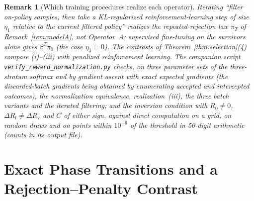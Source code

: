 \documentclass[11pt,a4paper]{article}
\newtheorem{remark}[theorem]{Remark}
\begin{document}
\begin{remark}[Which training procedures realize each operator]
Iterating ``filter on-policy samples, then take a KL-regularized reinforcement-learning step of size $\eta_1$ relative to the current filtered policy'' realizes the repeated-rejection law $\pi_T$ of Remark~\ref{rem:modelA}, not Operator~A; supervised fine-tuning on the survivors alone gives $\beta^T\pi_0$ (the case $\eta_1 = 0$).
The contrasts of Theorem~\ref{thm:selection}(4) compare (i)--(iii) with penalized reinforcement learning. The companion script \texttt{verify\_reward\_normalization.py} checks, on three parameter sets of the three-stratum softmax and by gradient ascent with exact expected gradients (the discarded-batch gradients being obtained by enumerating accepted and intercepted outcomes), the normalization equivalence, realization~(iii), the three batch variants and the iterated filtering; and the inversion condition with $R_0 \neq 0$, $\Delta R_{\mathrm{f}} \neq \Delta R_{\mathrm{v}}$ and $C$ of either sign, against direct computation on a grid, on random draws and on points within $10^{-6}$ of the threshold in 50-digit arithmetic (counts in its output file).
\end{remark}

\section{Exact Phase Transitions and a Rejection--Penalty Contrast}
\end{document}
